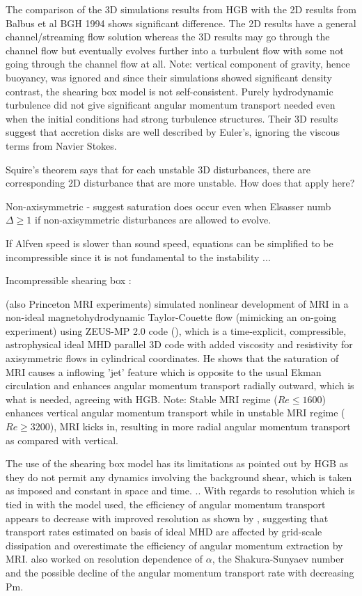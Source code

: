 \documentclass{jfm}
\begin{document}
The comparison of the 3D simulations results from HGB with the 2D results 
from Balbus et al BGH 1994 shows significant difference. The 2D results have
a general channel/streaming flow solution whereas the 3D results may go through
the channel flow but eventually evolves further into a turbulent flow with some
not going through the channel flow at all. Note: vertical component of gravity,
hence buoyancy, was  ignored and since their simulations showed significant 
density contrast, the shearing box model is not self-consistent. Purely 
hydrodynamic turbulence did not give significant angular momentum transport 
needed even when the initial conditions had strong turbulence structures. 
Their 3D results suggest that accretion disks are well described by Euler's, 
ignoring the viscous terms from Navier Stokes.

Squire's theorem says that for each unstable 3D disturbances, there are 
corresponding 2D disturbance that are more unstable. How does that apply here?

Non-axisymmetric \cite{Fleming2000} - suggest saturation does occur even when 
Elsasser numb $\Delta \ge 1$ if non-axisymmetric disturbances are allowed to 
evolve.

If Alfven speed is slower than sound speed, equations can be simplified to be 
incompressible since it is not fundamental to the instability \cite{Balbus1991} ...

Incompressible shearing box : \cite{Lesur2007}

\cite{Liu2008} (also Princeton MRI experiments) simulated nonlinear development
of MRI in a non-ideal magnetohydrodynamic Taylor-Couette flow (mimicking an 
on-going experiment) using ZEUS-MP 2.0 code (\cite{Hayes2006}), which is a 
time-explicit, compressible, astrophysical ideal MHD parallel 3D code with 
added viscosity and resistivity for axisymmetric flows in cylindrical 
coordinates. He shows that the saturation of MRI causes a inflowing 'jet' 
feature which is opposite to the usual Ekman circulation and enhances angular
momentum transport radially outward, which is what is needed, agreeing with 
HGB. Note: Stable MRI regime ($ Re \le 1600$) enhances vertical angular 
momentum transport while in unstable MRI regime ($Re \ge 3200$), MRI kicks in, 
resulting in more radial angular momentum transport as compared with vertical.

The use of the shearing box model has its limitations as pointed out by HGB as
they do not permit any dynamics involving the background shear, which is taken
as imposed and constant in space and time. \cite{Regev2008}.. With regards to 
resolution which is tied in with the model used, the efficiency of angular 
momentum transport appears to decrease with improved resolution as shown by 
\cite{Fomang2007}, suggesting that transport rates estimated on basis of ideal
MHD are affected by grid-scale dissipation and overestimate the efficiency of 
angular momentum extraction by MRI. \cite{Kapyla2008} also worked on resolution
dependence of $\alpha$, the Shakura-Sunyaev number and the possible decline of
the angular momentum transport rate with decreasing Pm.
\end{document}

